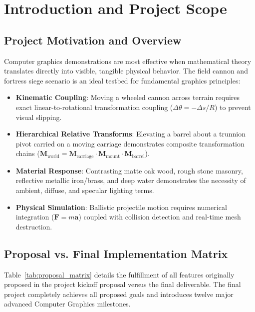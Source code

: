 \documentclass[11pt,a4paper]{article}
\begin{document}
\vspace{-2mm}
\tableofcontents
\vspace{4mm}

\section{Introduction and Project Scope}

\subsection{Project Motivation and Overview}
Computer graphics demonstrations are most effective when mathematical theory translates directly into visible, tangible physical behavior. The field cannon and fortress siege scenario is an ideal testbed for fundamental graphics principles:
\begin{itemize}[itemsep=2pt,topsep=2pt]
  \item \textbf{Kinematic Coupling}: Moving a wheeled cannon across terrain requires exact linear-to-rotational transformation coupling ($\Delta \theta = -\Delta s / R$) to prevent visual slipping.
  \item \textbf{Hierarchical Relative Transforms}: Elevating a barrel about a trunnion pivot carried on a moving carriage demonstrates composite transformation chains ($\mathbf{M}_{\text{world}} = \mathbf{M}_{\text{carriage}} \cdot \mathbf{M}_{\text{mount}} \cdot \mathbf{M}_{\text{barrel}}$).
  \item \textbf{Material Response}: Contrasting matte oak wood, rough stone masonry, reflective metallic iron/brass, and deep water demonstrates the necessity of ambient, diffuse, and specular lighting terms.
  \item \textbf{Physical Simulation}: Ballistic projectile motion requires numerical integration ($\mathbf{F} = m\mathbf{a}$) coupled with collision detection and real-time mesh destruction.
\end{itemize}

\subsection{Proposal vs. Final Implementation Matrix}
Table~\ref{tab:proposal_matrix} details the fulfillment of all features originally proposed in the project kickoff proposal versus the final deliverable. The final project completely achieves all proposed goals and introduces twelve major advanced Computer Graphics milestones.
\end{document}

